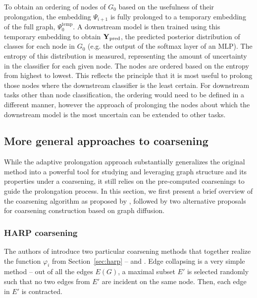 To obtain an ordering of nodes of \( G_0 \) based on the usefulness of their prolongation, the embedding \( \Psi_{i + 1} \) is fully prolonged to a temporary embedding of the full graph, \( \Psi_0^\mathrm{temp} \). A downstream model is then trained using this temporary embedding to obtain \( \mathbf{Y}_\mathrm{pred} \), the predicted posterior distribution of classes for each node in \( G_0 \) (e.g. the output of the softmax layer of an MLP). The entropy of this distribution is measured, representing the amount of uncertainty in the classifier for each given node. The nodes are ordered based on the entropy from highest to lowest. This reflects the principle that it is most useful to prolong those nodes where the downstream classifier is the least certain. For downstream tasks other than node classification, the ordering would need to be defined in a different manner, however the approach of prolonging the nodes about which the downstream model is the most uncertain can be extended to other tasks.

\subsection{More general approaches to coarsening}\label{sec:coarsening-algorithms}

While the adaptive prolongation approach substantially generalizes the original method into a powerful tool for studying and leveraging graph structure and its properties under a coarsening, it still relies on the pre-computed coarsenings to guide the prolongation process. In this section, we first present a brief overview of the coarsening algorithm as proposed by \cite{chen_harp_2018}, followed by two alternative proposals for coarsening construction based on graph diffusion.

\subsubsection{HARP coarsening}\label{sec:harp-coarsening}

The authors of \cite{chen_harp_2018} introduce two particular coarsening methods that together realize the function \( \varphi_i \) from Section~\ref{sec:harp} --  and . Edge collapsing is a very simple method -- out of all the edges \( E \left( G \right) \), a maximal subset \( E' \) is selected randomly such that no two edges from \( E' \) are incident on the same node. Then, each edge in \( E' \) is contracted.


